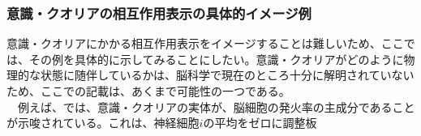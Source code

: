 \subsubsection{意識・クオリアの相互作用表示の具体的イメージ例}
意識・クオリアにかかる相互作用表示をイメージすることは難しいため、ここでは、その例を具体的に示してみることにしたい。意識・クオリアがどのように物理的な状態に随伴しているかは、脳科学で現在のところ十分に解明されていないため、ここでの記載は、あくまで可能性の一つである。\\
　例えば、\cite{Murray_2016}では、意識・クオリアの実体が、脳細胞の発火率の主成分であることが示唆されている。これは、神経細胞$i$の平均をゼロに調整板